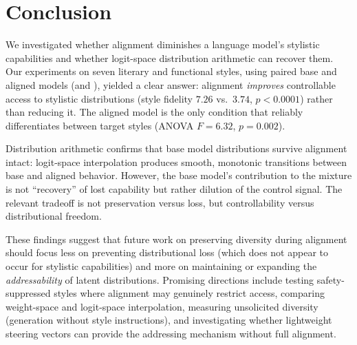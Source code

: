 \section{Conclusion}
\label{sec:conclusion}

We investigated whether alignment diminishes a language model's stylistic
capabilities and whether logit-space distribution arithmetic can recover them.
Our experiments on seven literary and functional styles, using paired base and
aligned models (\qwenbase and \qweninst), yielded a clear answer:
alignment \emph{improves} controllable access to stylistic distributions
(style fidelity $7.26$ vs.\ $3.74$, $p < 0.0001$) rather than reducing it.
The aligned model is the only condition that reliably differentiates between
target styles (ANOVA $F = 6.32$, $p = 0.002$).

Distribution arithmetic confirms that base model distributions survive alignment
intact: logit-space interpolation produces smooth, monotonic transitions between
base and aligned behavior. However, the base model's contribution to the mixture
is not ``recovery'' of lost capability but rather dilution of the control signal.
The relevant tradeoff is not preservation versus loss, but controllability versus
distributional freedom.

These findings suggest that future work on preserving diversity during alignment
should focus less on preventing distributional loss (which does not appear to
occur for stylistic capabilities) and more on maintaining or expanding the
\emph{addressability} of latent distributions. Promising directions include
testing safety-suppressed styles where alignment may genuinely restrict access,
comparing weight-space and logit-space interpolation, measuring unsolicited
diversity (generation without style instructions), and investigating whether
lightweight steering vectors can provide the addressing mechanism without
full alignment.
